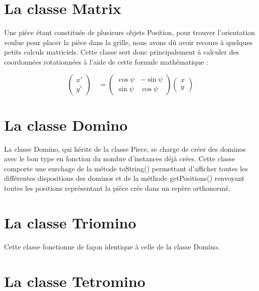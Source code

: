 \documentclass[a4paper, titlepage, french]{report}
\begin{document}
\bigskip

\section{La classe Matrix}

Une pièce étant constituée de plusieurs objets Position, pour trouver l'orientation voulue pour placer
la pièce dans la grille, nous avons dû avoir recours à quelques petits calculs matriciels.
Cette classe sert donc principalement à calculer des coordonnées rotationnées à l'aide de cette
formule mathématique :

\[
    \begin{pmatrix}
        x' \\
        y'
    \end{pmatrix}
    \quad
    =
    \begin{pmatrix}
        \cos \psi & - \sin \psi \\
        \sin \psi & \cos \psi
    \end{pmatrix}
    \begin{pmatrix}
        x \\
        y
    \end{pmatrix}
\]


\bigskip

\section{La classe Domino}

La classe Domino, qui hérite de la classe Piece, se charge de créer des dominos avec le bon type 
en fonction du nombre d'instances déjà crées. Cette classe comporte une surchage de la métode toString()
permettant d'afficher toutes les différentes dispositions des dominos et de la méthode getPositions()
renvoyant toutes les positions représentant la pièce crée dans un repère orthonormé.

\bigskip

\section{La classe Triomino}

Cette classe fonctionne de façon identique à celle de la classe Domino.

\bigskip

\section{La classe Tetromino}
\end{document}
